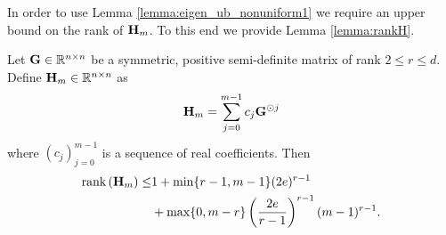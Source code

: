 In order to use Lemma \ref{lemma:eigen_ub_nonuniform1} we require an upper bound on the rank of $\mathbf{H}_m$. To this end we provide Lemma \ref{lemma:rankH}.

\begin{lemma}\label{lemma:rankH}
     Let $\mathbf{G}\in \mathbb{R}^{n \times n}$ be a symmetric, positive semi-definite matrix of rank $2 \leq r \leq d$. Define $\mathbf{H}_m \in \mathbb{R}^{n \times n}$ as 
     \begin{equation}
         \mathbf{H}_m = \sum_{j=0}^{m-1} c_j \mathbf{G}^{\odot j}
     \end{equation}
     where $(c_j)_{j=0}^{m-1}$ is a sequence of real coefficients. Then
     \begin{equation}
     \begin{aligned}
         \text{rank}\left(\mathbf{H}_m \right) \leq &1 + \min\{r-1, m-1 \}(2e)^{r-1} \\
         &+ \max\{0, m-r\}\left(\frac{2e}{r-1}\right)^{r-1} (m-1)^{r-1}.
         \end{aligned}
     \end{equation}
\end{lemma}


